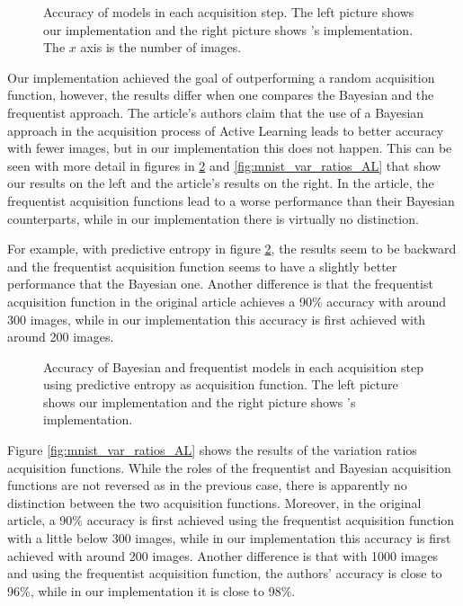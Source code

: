 \begin{figure}[H]
    \centering
    \hfill
    \caption{Accuracy of models in each acquisition step. The left picture shows our implementation and the right picture shows \citeauthor{Gal2016Active}'s implementation. The $x$ axis is the number of images.}
    \label{fig:mnist_comparison_active_learning_random}
\end{figure}

Our implementation achieved the goal of outperforming a random acquisition function, however, the results differ when one compares the Bayesian and the frequentist approach. The article's authors claim that the use of a Bayesian approach in the acquisition process of Active Learning leads to better accuracy with fewer images, but in our implementation this does not happen. This can be seen with more detail in figures in \ref{fig:mnist_pred_entropy_AL} and \ref{fig:mnist_var_ratios_AL} that show our results on the left and the article's results on the right. In the article, the frequentist acquisition functions lead to a worse performance than their Bayesian counterparts, while in our implementation there is virtually no distinction.

For example, with predictive entropy in figure \ref{fig:mnist_pred_entropy_AL}, the results seem to be backward and the frequentist acquisition function seems to have a slightly better performance that the Bayesian one. Another difference is that the frequentist acquisition function in the original article achieves a 90\% accuracy with around 300 images, while in our implementation this accuracy is first achieved with around 200 images.

\begin{figure}[H]
  \centering
  \hfill
  \caption{Accuracy of Bayesian and frequentist models in each acquisition step using predictive entropy as acquisition function. The left picture shows our implementation and the right picture shows \citeauthor{Gal2016Active}'s implementation.}
  \label{fig:mnist_pred_entropy_AL}
\end{figure}

Figure \ref{fig:mnist_var_ratios_AL} shows the results of the variation ratios acquisition functions. While the roles of the frequentist and Bayesian acquisition functions are not reversed as in the previous case, there is apparently no distinction between the two acquisition functions. Moreover, in the original article, a 90\% accuracy is first achieved using the frequentist acquisition function with a little below 300 images, while in our implementation this accuracy is first achieved with around 200 images. Another difference is that with 1000 images and using the frequentist acquisition function, the authors' accuracy is close to 96\%, while in our implementation it is close to 98\%.

